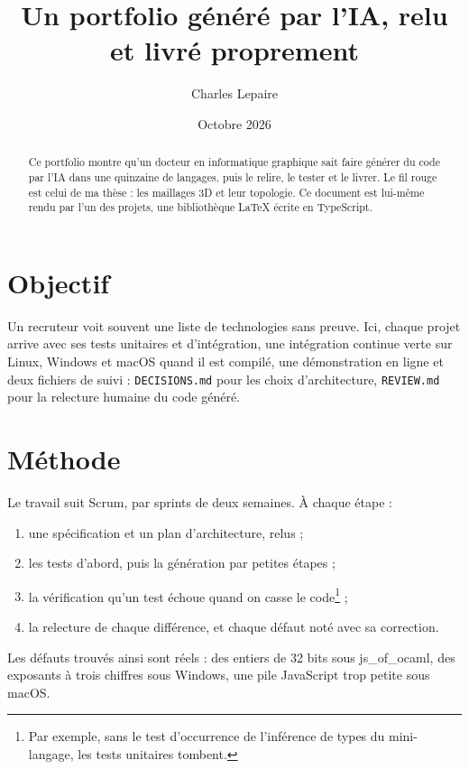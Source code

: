 \documentclass{article}
\title{Un portfolio généré par l'IA, relu et livré proprement}
\author{Charles Lepaire}
\date{Octobre 2026}
\begin{document}
\maketitle

\begin{abstract}
Ce portfolio montre qu'un docteur en informatique graphique sait faire générer du code par l'IA dans
une quinzaine de langages, puis le relire, le tester et le livrer. Le fil rouge est celui de ma thèse :
les maillages 3D et leur topologie. Ce document est lui-même rendu par l'un des projets, une
bibliothèque \LaTeX{} écrite en TypeScript.
\end{abstract}

\tableofcontents

\section{Objectif}\label{sec:objectif}
Un recruteur voit souvent une liste de technologies sans preuve. Ici, chaque projet arrive avec ses
tests unitaires et d'intégration, une intégration continue verte sur Linux, Windows et macOS quand il
est compilé, une démonstration en ligne et deux fichiers de suivi : \texttt{DECISIONS.md} pour les
choix d'architecture, \texttt{REVIEW.md} pour la relecture humaine du code généré.

\section{Méthode}\label{sec:methode}
Le travail suit Scrum, par sprints de deux semaines. À chaque étape :
\begin{enumerate}
\item une spécification et un plan d'architecture, relus ;
\item les tests d'abord, puis la génération par petites étapes ;
\item la vérification qu'un test échoue quand on casse le code\footnote{Par exemple, sans le test
d'occurrence de l'inférence de types du mini-langage, les tests unitaires tombent.} ;
\item la relecture de chaque différence, et chaque défaut noté avec sa correction.
\end{enumerate}
Les défauts trouvés ainsi sont réels : des entiers de 32 bits sous js\_of\_ocaml, des exposants à
trois chiffres sous Windows, une pile JavaScript trop petite sous macOS.
\end{document}
